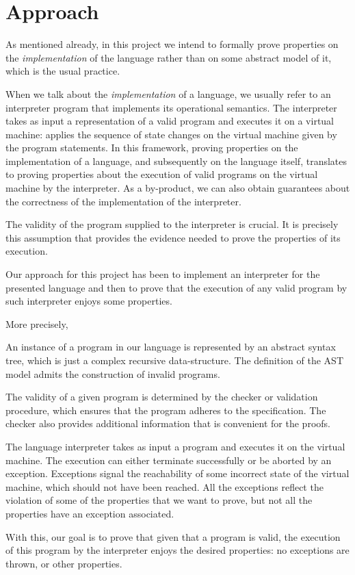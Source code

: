 \section{Approach}

As mentioned already, in this project we intend to formally prove properties on the \textit{implementation} of the language rather than on some abstract model of it, which is the usual practice.

When we talk about the \textit{implementation} of a language, we usually refer to an interpreter program that implements its operational semantics. The interpreter takes as input a representation of a valid program and executes it on a virtual machine: applies the sequence of state changes on the virtual machine given by the program statements. In this framework, proving properties on the implementation of a language, and subsequently on the language itself, translates to proving properties about the execution of valid programs on the virtual machine by the interpreter. As a by-product, we can also obtain guarantees about the correctness of the implementation of the interpreter.

The validity of the program supplied to the interpreter is crucial. It is precisely this assumption that provides the evidence needed to prove the properties of its execution.

\vspace{0.6cm}

Our approach for this project has been to implement an interpreter for the presented language and then to prove that the execution of any valid program by such interpreter enjoys some properties.

\noindent More precisely,

An instance of a program in our language is represented by an abstract syntax tree, which is just a complex recursive data-structure. The definition of the AST model admits the construction of invalid programs.

The validity of a given program is determined by the checker or validation procedure, which ensures that the program adheres to the specification. The checker also provides additional information that is convenient for the proofs.

The language interpreter takes as input a program and executes it on the virtual machine. The execution can either terminate successfully or be aborted by an exception. Exceptions signal the reachability of some incorrect state of the virtual machine, which should not have been reached. All the exceptions reflect the violation of some of the properties that we want to prove, but not all the properties have an exception associated.

With this, our goal is to prove that given that a program is valid, the execution of this program by the interpreter enjoys the desired properties: no exceptions are thrown, or other properties.

